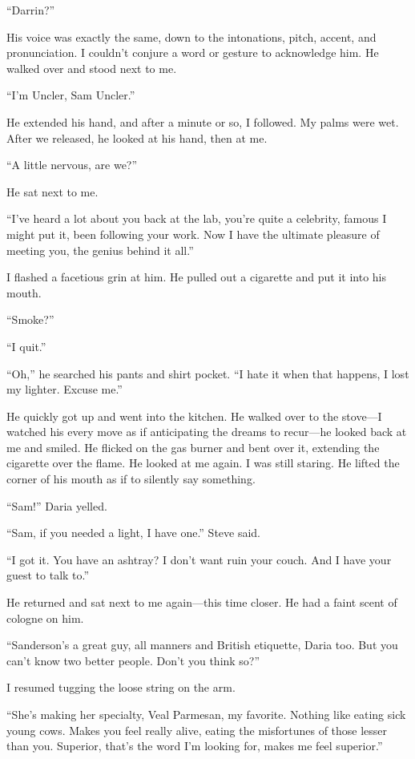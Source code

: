 ``Darrin?''

His voice was exactly the same, down to the intonations, pitch, accent,
and pronunciation. I couldn't conjure a word or gesture to acknowledge
him. He walked over and stood next to me.

``I'm Uncler, Sam Uncler.''

He extended his hand, and after a minute or so, I followed. My palms
were wet. After we released, he looked at his hand, then at me.

``A little nervous, are we?''

He sat next to me.

``I've heard a lot about you back at the lab, you're quite a celebrity,
famous I might put it, been following your work. Now I have the ultimate
pleasure of meeting you, the genius behind it all.''

I flashed a facetious grin at him. He pulled out a cigarette and put it
into his mouth.

``Smoke?''

``I quit.''

``Oh,'' he searched his pants and shirt pocket. ``I hate it when that
happens, I lost my lighter. Excuse me.''

He quickly got up and went into the kitchen. He walked over to the
stove---I watched his every move as if anticipating the dreams to
recur---he looked back at me and smiled. He flicked on the gas burner
and bent over it, extending the cigarette over the flame. He looked at
me again. I was still staring. He lifted the corner of his mouth as if
to silently say something.

``Sam!'' Daria yelled.

``Sam, if you needed a light, I have one.'' Steve said.

``I got it. You have an ashtray? I don't want ruin your couch. And I
have your guest to talk to.''

He returned and sat next to me again---this time closer. He had a faint
scent of cologne on him.

``Sanderson's a great guy, all manners and British etiquette, Daria too.
But you can't know two better people. Don't you think so?''

I resumed tugging the loose string on the arm.

``She's making her specialty, Veal Parmesan, my favorite. Nothing like
eating sick young cows. Makes you feel really alive, eating the
misfortunes of those lesser than you. Superior, that's the word I'm
looking for, makes me feel superior.''

